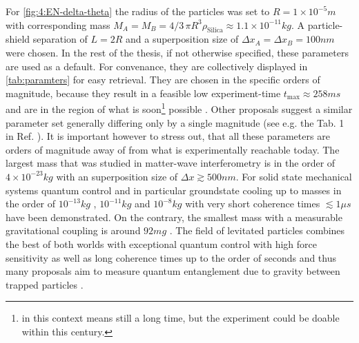 For \cref{fig:4:EN-delta-theta} the radius of the particles was set to $R=1\times 10^{-5}\si{m}$ with corresponding mass $M_A = M_B = 4/3\, \pi R^3 \rho_\mathrm{Silica} \approx 1.1\times 10^{-11}\si{kg}$.
A particle-shield separation of $L=2R$ and a superposition size of $\Delta x_A = \Delta x_B = 100\si{nm}$ were chosen.
In the rest of the thesis, if not otherwise specified, these parameters are used as a default.
For convenance, they are collectively displayed in \cref{tab:paramters} for easy retrieval.
They are chosen in the specific orders of magnitude, because they result in a feasible low experiment-time $t_\mathrm{max}\approx 258\si{ms}$ and are in the region of what is soon\footnote{ in this context means still a long time, but the experiment could be doable within this century.} possible \cite[Timestamp: 51:00]{Aspelmeyer_2024}.
Other proposals suggest a similar parameter set generally differing only by a single magnitude (see e.g. the Tab. 1 in Ref. \cite{Rijavec_2021}).
It is important however to stress out, that all these parameters are orders of magnitude away of from what is experimentally reachable today.
The largest mass that was studied in matter-wave interferometry is in the order of $4\times 10^{-23}\si{kg}$ \cite{Fein_2019} with an superposition size of $\Delta x \gtrsim 500\si{nm}$.
For solid state mechanical systems quantum control and in particular groundstate cooling up to masses in the order of $10^{-13}\si{kg}$ \cite{OConnell_2010}, $10^{-11}\si{kg}$ \cite{Lee_2011} and $10^{-8}\si{kg}$ \cite{Bild_2023} with very short coherence times $\lesssim 1\si{\mu s}$ have been demonstrated.
On the contrary, the smallest mass with a measurable gravitational coupling is around $92 \si{mg}$ \cite{Westphal_2021}.
The field of levitated particles combines the best of both worlds with exceptional quantum control with high force sensitivity as well as long coherence times up to the order of seconds \cite{Aspelmeyer_2024} and thus many proposals aim to measure quantum entanglement due to gravity between trapped particles \cite{Krisnanda_2020}.

